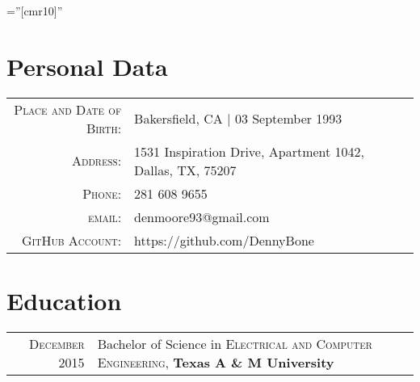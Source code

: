 \documentclass[a4paper,10pt]{article} %
\begin{document}
\pagestyle{empty} %

\font\fb=''[cmr10]'' %


\par{\bigskip\par} %

\section{Personal Data}

\begin{tabular}{rl}
\textsc{Place and Date of Birth:} & Bakersfield, CA  | 03 September 1993 \\
\textsc{Address:} & 1531 Inspiration Drive, Apartment 1042, Dallas, TX, 75207 \\
\textsc{Phone:} & 281 608 9655\\
\textsc{email:} & denmoore93@gmail.com\\
\textsc{GitHub Account:} & https://github.com/DennyBone
\end{tabular}



\section{Education}

\begin{tabular}{rl}	
\textsc{December} 2015 & Bachelor of Science in \textsc{Electrical and Computer Engineering}, \textbf{Texas A \& M University}\\


\end{tabular}



\end{document}
